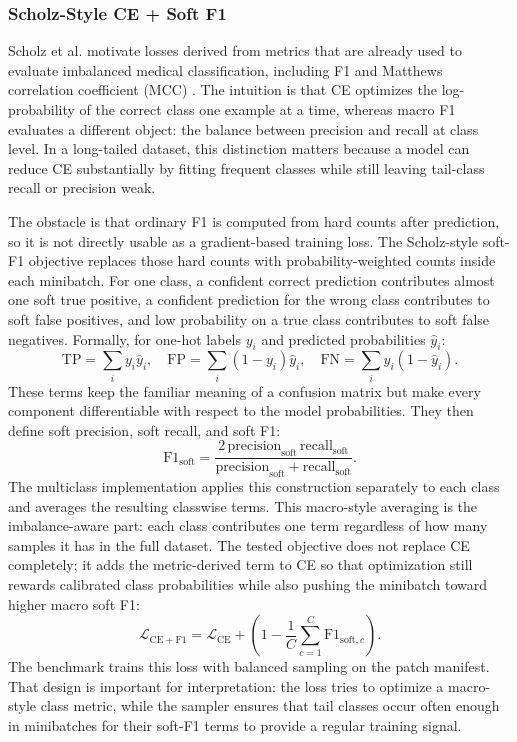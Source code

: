 \documentclass[11pt]{article}
\begin{document}
\subsubsection{Scholz-Style CE + Soft F1}
Scholz et al. motivate losses derived from metrics that are already used to evaluate imbalanced medical classification, including F1 and Matthews correlation coefficient (MCC) \citep{scholz2024imbalanceAware}. The intuition is that CE optimizes the log-probability of the correct class one example at a time, whereas macro F1 evaluates a different object: the balance between precision and recall at class level. In a long-tailed dataset, this distinction matters because a model can reduce CE substantially by fitting frequent classes while still leaving tail-class recall or precision weak.

The obstacle is that ordinary F1 is computed from hard counts after prediction, so it is not directly usable as a gradient-based training loss. The Scholz-style soft-F1 objective replaces those hard counts with probability-weighted counts inside each minibatch. For one class, a confident correct prediction contributes almost one soft true positive, a confident prediction for the wrong class contributes to soft false positives, and low probability on a true class contributes to soft false negatives. Formally, for one-hot labels $y_i$ and predicted probabilities $\hat{y}_i$:
\begin{equation}
  \mathrm{TP}=\sum_i y_i\hat{y}_i,\quad
  \mathrm{FP}=\sum_i (1-y_i)\hat{y}_i,\quad
  \mathrm{FN}=\sum_i y_i(1-\hat{y}_i).
  \label{eq:soft-confusion-f1}
\end{equation}
\noindent These terms keep the familiar meaning of a confusion matrix but make every component differentiable with respect to the model probabilities. They then define soft precision, soft recall, and soft F1:
\begin{equation}
  \mathrm{F1}_{\mathrm{soft}} =
  \frac{2\,\mathrm{precision}_{\mathrm{soft}}\,\mathrm{recall}_{\mathrm{soft}}}
       {\mathrm{precision}_{\mathrm{soft}}+\mathrm{recall}_{\mathrm{soft}}}.
  \label{eq:soft-f1}
\end{equation}
\noindent The multiclass implementation applies this construction separately to each class and averages the resulting classwise terms. This macro-style averaging is the imbalance-aware part: each class contributes one term regardless of how many samples it has in the full dataset. The tested objective does not replace CE completely; it adds the metric-derived term to CE so that optimization still rewards calibrated class probabilities while also pushing the minibatch toward higher macro soft F1:
\begin{equation}
  \mathcal{L}_{\mathrm{CE+F1}} = \mathcal{L}_{\mathrm{CE}} +
  \left(1-\frac{1}{C}\sum_{c=1}^{C}\mathrm{F1}_{\mathrm{soft},c}\right).
  \label{eq:ce-soft-f1}
\end{equation}
\noindent The benchmark trains this loss with balanced sampling on the patch manifest. That design is important for interpretation: the loss tries to optimize a macro-style class metric, while the sampler ensures that tail classes occur often enough in minibatches for their soft-F1 terms to provide a regular training signal.
\end{document}
